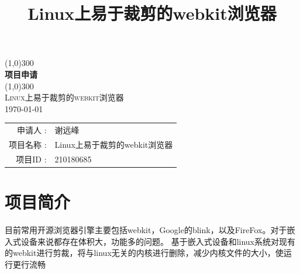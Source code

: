 \documentclass[UTF8,14pt]{article}
\title{Linux上易于裁剪的webkit浏览器}
\numberwithin{figure}{section}
\begin{document}
\begin{titlepage}
	\begin{center}
		\line(1,0){300}\\
		[0.65cm]
		\Huge{\bfseries 项目申请 }\\
		\line(1,0){300}\\
		\textsc{\LARGE Linux上易于裁剪的webkit浏览器}\\
		[0.5cm]
		\Large{\today}\\
		[5.5cm]
		\begin{tabular}{rl}
			申请人 :           & 谢远峰                        \\
			项目名称         : & Linux上易于裁剪的webkit浏览器 \\
			项目ID        :    & 210180685
		\end{tabular}
	\end{center}
\end{titlepage}

\section{项目简介}
目前常用开源浏览器引擎主要包括webkit，Google的blink，以及FireFox。对于嵌入式设备来说都存在体积大，功能多的问题。
基于嵌入式设备和linux系统对现有的webkit进行剪裁，将与linux无关的内核进行删除，减少内核文件的大小，使运行更行流畅
\end{document}
